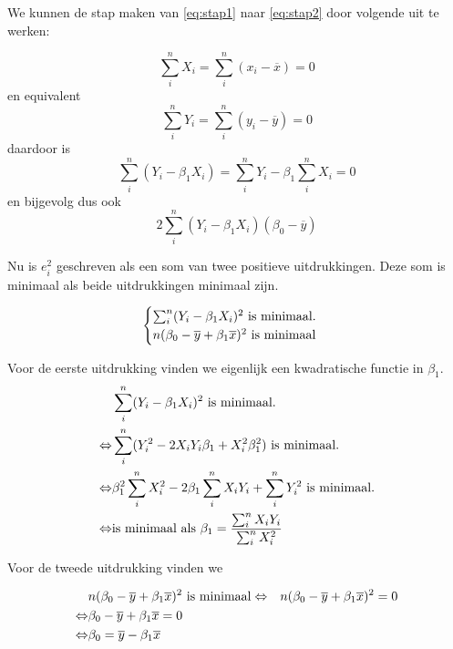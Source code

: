 \begin{theorem}
	We kunnen de stap maken van \ref{eq:stap1} naar \ref{eq:stap2} door volgende uit te werken:
	
\[ \sum_{i}^{n}X_i = \sum_{i}^{n} (x_i - \overline{x}) = 0 \]
	en equivalent
\[ \sum_{i}^{n}Y_i = \sum_{i}^{n} (y_i - \overline{y}) = 0 \]
daardoor is
\[ \sum_{i}^{n}(Y_i - \beta_1 X_i) = \sum_{i}^{n}Y_i - \beta_1 \sum_{i}^{n}X_i = 0 \]
en bijgevolg dus ook
\[ 2 \sum_{i}^{n}(Y_i - \beta_1 X_i)(\beta_0 - \overline{y}) \]
	

Nu is $e^{2}_{i}$ geschreven als een som van twee positieve uitdrukkingen. Deze som is minimaal als beide uitdrukkingen minimaal zijn.

  \begin{equation}
    \begin{cases}
      \sum_{i}^{n}( Y_{i} - \beta_{1} X_{i})^{2} \textnormal{ is minimaal.}\\
      n(\beta_{0} - \overline{y} + \beta_{1} \overline{x})^{2} \textnormal{ is minimaal}
    \end{cases}
    \label{eq:vgl}
  \end{equation}
	

Voor de eerste uitdrukking vinden we eigenlijk een kwadratische functie in $\beta_1$.
  \begin{eqnarray}
		& \sum_{i}^{n}( Y_{i} - \beta_{1} X_{i})^{2} \textnormal{ is minimaal.} \label{eq:uitdrukking}\\
		\Leftrightarrow & \sum_i^n (Y_i^2 - 2X_iY_i\beta_1 + X_i^2\beta_1^2) \textnormal{ is minimaal.} \\
		\Leftrightarrow & \beta_1^2 \sum_i^n X_i^2 - 2\beta_1 \sum_i^n X_iY_i + \sum_i^nY_i^2 \textnormal{ is minimaal.} \\
		\Leftrightarrow & \textnormal{is minimaal als } \beta_{1} = \frac{\sum_{i}^{n} X_{i}Y_{i}}{\sum_{i}^{n} X_{i}^{2}}
	\end{eqnarray}

Voor de tweede uitdrukking vinden we

  \begin{eqnarray}
		& n(\beta_{0} - \overline{y} + \beta_{1} \overline{x})^{2} \textnormal{ is minimaal}
		\Leftrightarrow & n(\beta_{0} - \overline{y} + \beta_{1} \overline{x})^{2} = 0 \\
		\Leftrightarrow & \beta_{0} - \overline{y} + \beta_{1} \overline{x} = 0 \\
		\Leftrightarrow & \beta_{0} = \overline{y} - \beta_{1}\overline{x} 
	\end{eqnarray}


\end{theorem}
